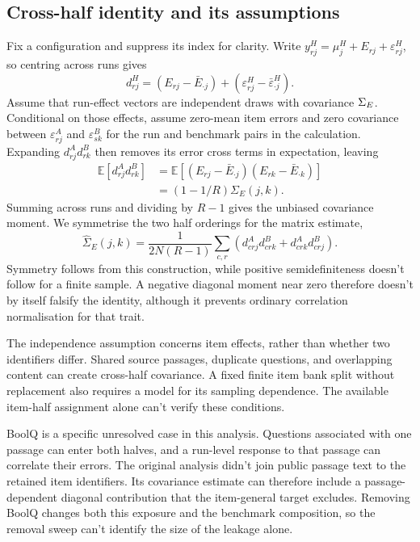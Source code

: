 \subsection{Cross-half identity and its assumptions}
Fix a configuration and suppress its index for clarity. Write $y^H_{rj}=\mu^H_j+E_{rj}+\varepsilon^H_{rj}$, so centring across runs gives
\begin{equation}
d^H_{rj}=(E_{rj}-\bar E_{\cdot j})+(\varepsilon^H_{rj}-\bar\varepsilon^H_{\cdot j}).
\end{equation}
Assume that run-effect vectors are independent draws with covariance $\Sigma_E$. Conditional on those effects, assume zero-mean item errors and zero covariance between $\varepsilon^A_{rj}$ and $\varepsilon^B_{sk}$ for the run and benchmark pairs in the calculation. Expanding $d^A_{rj}d^B_{rk}$ then removes its error cross terms in expectation, leaving
\begin{align}
\mathbb E[d^A_{rj}d^B_{rk}]
&=\mathbb E[(E_{rj}-\bar E_{\cdot j})(E_{rk}-\bar E_{\cdot k})]\\
&=(1-1/R)\Sigma_E(j,k).
\end{align}
Summing across runs and dividing by $R-1$ gives the unbiased covariance moment. We symmetrise the two half orderings for the matrix estimate,
\begin{equation}
\widehat\Sigma_E(j,k)=\frac{1}{2N(R-1)}\sum_{c,r}
\left(d^A_{crj}d^B_{crk}+d^A_{crk}d^B_{crj}\right).
\end{equation}
Symmetry follows from this construction, while positive semidefiniteness doesn't follow for a finite sample. A negative diagonal moment near zero therefore doesn't by itself falsify the identity, although it prevents ordinary correlation normalisation for that trait.

The independence assumption concerns item effects, rather than whether two identifiers differ. Shared source passages, duplicate questions, and overlapping content can create cross-half covariance. A fixed finite item bank split without replacement also requires a model for its sampling dependence. The available item-half assignment alone can't verify these conditions.

BoolQ is a specific unresolved case in this analysis. Questions associated with one passage can enter both halves, and a run-level response to that passage can correlate their errors. The original analysis didn't join public passage text to the retained item identifiers. Its covariance estimate can therefore include a passage-dependent diagonal contribution that the item-general target excludes. Removing BoolQ changes both this exposure and the benchmark composition, so the removal sweep can't identify the size of the leakage alone.

